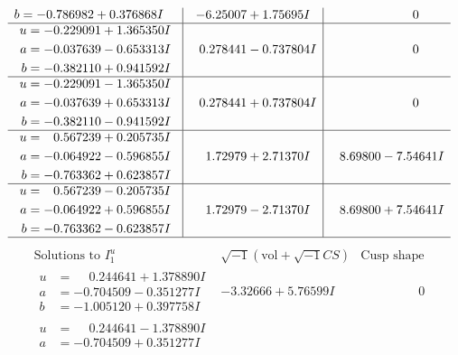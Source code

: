\documentclass[1p]{elsarticle_modified}
\theoremstyle{definition}
\newcommand{\I}{\sqrt{-1}}
\begin{document}
$$\begin{array}{c|c|c}
\begin{aligned}
b &= -0.786982 + 0.376868 I\end{aligned}
 & -6.25007 + 1.75695 I & \phantom{-0.000000 } 0 \\ \hline\begin{aligned}
u &= -0.229091 + 1.365350 I \\
a &= -0.037639 - 0.653313 I \\
b &= -0.382110 + 0.941592 I\end{aligned}
 & \phantom{-}0.278441 - 0.737804 I & \phantom{-0.000000 } 0 \\ \hline\begin{aligned}
u &= -0.229091 - 1.365350 I \\
a &= -0.037639 + 0.653313 I \\
b &= -0.382110 - 0.941592 I\end{aligned}
 & \phantom{-}0.278441 + 0.737804 I & \phantom{-0.000000 } 0 \\ \hline\begin{aligned}
u &= \phantom{-}0.567239 + 0.205735 I \\
a &= -0.064922 - 0.596855 I \\
b &= -0.763362 + 0.623857 I\end{aligned}
 & \phantom{-}1.72979 + 2.71370 I & \phantom{-}8.69800 - 7.54641 I \\ \hline\begin{aligned}
u &= \phantom{-}0.567239 - 0.205735 I \\
a &= -0.064922 + 0.596855 I \\
b &= -0.763362 - 0.623857 I\end{aligned}
 & \phantom{-}1.72979 - 2.71370 I & \phantom{-}8.69800 + 7.54641 I\\
 \hline 
 \end{array}$$\newpage$$\begin{array}{c|c|c}  
\text{Solutions to }I^u_{1}& \I (\text{vol} + \sqrt{-1}CS) & \text{Cusp shape}\\
 \hline 
\begin{aligned}
u &= \phantom{-}0.244641 + 1.378890 I \\
a &= -0.704509 - 0.351277 I \\
b &= -1.005120 + 0.397758 I\end{aligned}
 & -3.32666 + 5.76599 I & \phantom{-0.000000 } 0 \\ \hline\begin{aligned}
u &= \phantom{-}0.244641 - 1.378890 I \\
a &= -0.704509 + 0.351277 I \\

\end{aligned}
\end{array}$$
\end{document}

